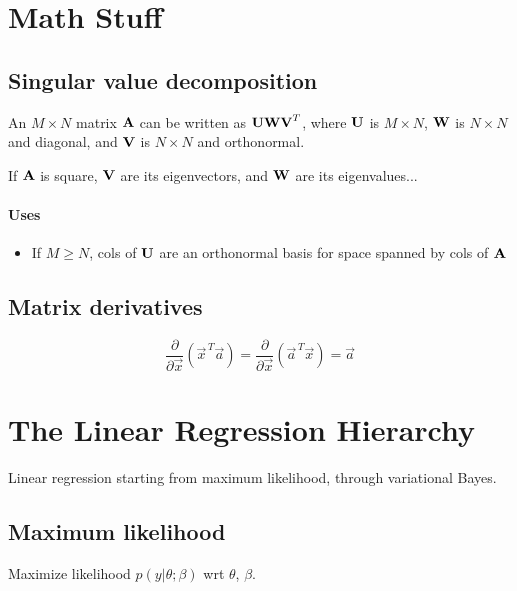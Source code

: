 \documentclass[11pt]{article}
\begin{document}
\newpage
\begin{appendices}
\section{Math Stuff}
\subsection{Singular value decomposition}
\label{subsec:SVD}
An $M \times N$ matrix $\textbf{A}$ can be written as $\textbf{U}\textbf{W}\textbf{V}^T$,
where $\textbf{U}$ is $M \times N$, $\textbf{W}$ is $N \times N$ and diagonal, and
$\textbf{V}$ is $N \times N$ and orthonormal.

If $\textbf{A}$ is square, $\textbf{V}$ are its eigenvectors, and $\textbf{W}$
are its eigenvalues...

\paragraph{Uses}
\begin{itemize}
  \item If $M \geq N$, cols of $\textbf{U}$ are an orthonormal basis for space
  spanned by cols of $\textbf{A}$
\end{itemize}

\TODOFIN{}

\subsection{Matrix derivatives}

\begin{equation}
  \frac{\partial}{\partial \vec{x}} \left( \vec{x}^{\, T} \vec{a} \right) =
  \frac{\partial}{\partial \vec{x}} \left( \vec{a}^{\, T} \vec{x} \right) =
  \vec{a} 
\end{equation}



\section{The Linear Regression Hierarchy}
Linear regression starting from maximum likelihood, through variational Bayes.
\subsection{Maximum likelihood}
Maximize likelihood $p(y | \theta ; \beta)$ wrt $\theta$, $\beta$.


\end{appendices}
\end{document}
